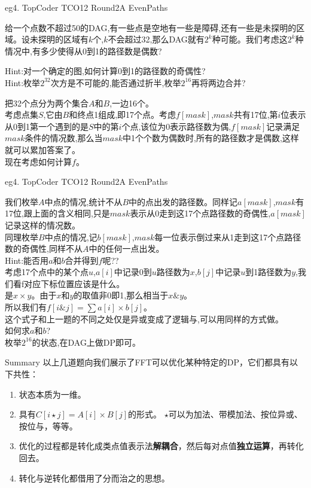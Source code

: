 \documentclass[allowframebreaks,10pt]{beamer}
\begin{document}
\begin{frame}{eg4. TopCoder TCO12 Round2A EvenPaths}
\begin{example}
给一个点数不超过50的DAG,有一些点是空地有一些是障碍,还有一些是未探明的区域。设未探明的区域有$k$个,$k$不会超过32,那么DAG就有$2^k$种可能。我们考虑这$2^k$种情况中,有多少使得从0到1的路径数是偶数?
\end{example}
\pause
Hint:对一个确定的图,如何计算0到1的路径数的奇偶性? \\
\pause
Hint:枚举$2^{32}$次方是不可能的,能否通过折半,枚举$2^{16}$再将两边合并?
\pause
\begin{solution}
把32个点分为两个集合$A$和$B$,一边16个。\\
考虑点集$S$,它由$B$和终点1组成,即17个点。考虑$f[mask]$,$mask$共有17位,第$i$位表示从0到1第一个遇到的是$S$中的第$i$个点,该位为0表示路径数为偶,$f[mask]$记录满足$mask$条件的情况数,那么当$mask$中1个个数为偶数时,所有的路径数才是偶数,这样就可以累加答案了。\\
\pause
现在考虑如何计算$f$。
	\end{solution}
	\end{frame}
\begin{frame}{eg4. TopCoder TCO12 Round2A EvenPaths}
\begin{solution}
我们枚举$A$中点的情况,统计不从$B$中的点出发的路径数。同样记$a[mask]$,$mask$有17位,跟上面的含义相同,只是$mask$表示从0走到这17个点路径数的奇偶性,$a[mask]$记录这样的情况数。\\
\pause
同理枚举$B$中点的情况,记$b[mask]$,$mask$每一位表示倒过来从1走到这17个点路径数的奇偶性,同样不从$A$中的任何一点出发。\\
\pause
Hint:能否用$a$和$b$合并得到$f$呢??\\
\pause
考虑17个点中的某个点$u$,$a[i]$中记录0到$u$路径数为$x$,$b[j]$中记录$u$到1路径数为$y$,我们看f对应下标位置应该是什么。\\
\pause
是$x \times y$。由于$x$和$y$的取值非0即1,那么相当于$x\&y$。\\
\pause
所以我们有$f[i\&j]=\sum a[i] \times b[j]$。\\
\pause
这个式子和上一题的不同之处仅是异或变成了逻辑与,可以用同样的方式做。\\
\pause
如何求$a$和$b$?\\
\pause
枚举$2^{16}$的状态,在DAG上做DP即可。
\end{solution}
\end{frame}
\begin{frame}{Summary}
以上几道题向我们展示了FFT可以优化某种特定的DP，它们都具有以下共性：
\pause
\begin{enumerate}
\item 状态本质为一维。 
\pause
\item 具有$C[i \star j] = A[i] \times B[j]$的形式。
$\star$可以为加法、带模加法、按位异或、按位与，等等。
\pause
\item 优化的过程都是转化成类点值表示法\textbf{解耦合}，然后每对点值\textbf{独立运算}，再转化回去。
\pause
\item 转化与逆转化都借用了分而治之的思想。
\end{enumerate}
\end{frame}
\end{document}
